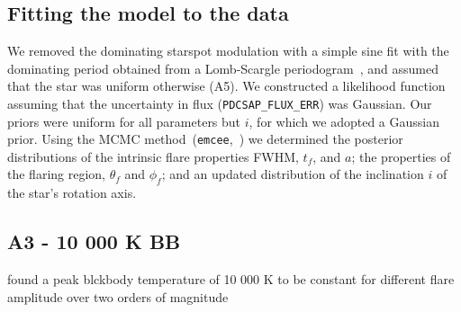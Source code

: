 \documentclass[fleqn,usenatbib,letters]{mnras}%
\begin{document}
\subsection{Fitting the model to the data}
\label{ssec:fittingmodeltodata}
We removed the dominating starspot modulation with a simple sine fit with the dominating period obtained from a Lomb-Scargle periodogram~\citep{lomb1976, scargle1982}, and assumed that the star was uniform otherwise (A5).%
We constructed a likelihood function assuming that the uncertainty in flux (\texttt{PDCSAP\_FLUX\_ERR}) was Gaussian. Our priors were uniform for all parameters but $i$, for which we adopted a Gaussian prior. Using the MCMC method~(\texttt{emcee},~\citealt{foreman_mackey2013}) we determined the posterior distributions of the intrinsic flare properties FWHM, $t_f$, and $a$; the properties of the flaring region, $\theta_f$ and $\phi_f$; and an updated distribution of the inclination $i$ of the star's rotation axis.
\subsection{A3 -  10 000 K BB}
\citet{kowalski2013} found a peak blckbody temperature of 10 000 K to be constant for different flare amplitude over two orders of magnitude
\end{document}
